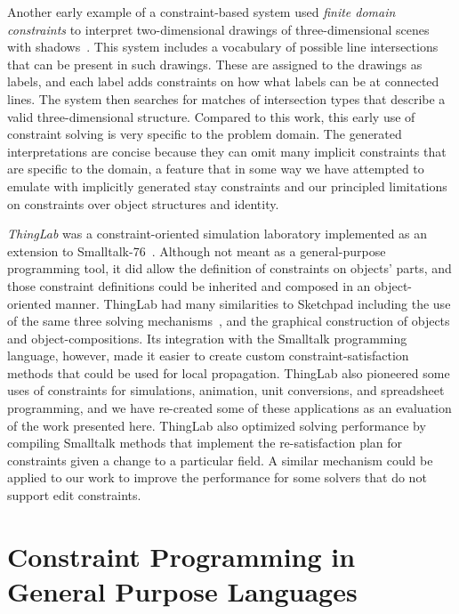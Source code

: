 Another early example of a constraint-based system used \emph{finite domain
  constraints} to interpret two-dimensional drawings of three-dimensional scenes
with shadows~\cite{waltz1972generating}. %
This system includes a vocabulary of possible
line intersections that can be present in such drawings. These are assigned to
the drawings as labels, and each label adds constraints on how what labels can
be at connected lines. %
The system then searches for matches of intersection
types that describe a valid three-dimensional structure. Compared to this work,
this early use of constraint solving is very specific to the problem domain. The
generated interpretations %
are concise because they can omit
many implicit constraints that are specific to the domain, a feature that in
some way we have attempted to emulate with implicitly generated stay constraints
and our principled limitations on constraints over object structures and
identity.

\emph{ThingLab} was a constraint-oriented simulation laboratory implemented
as an extension to
Smalltalk-76~\cite{ingalls1978smalltalk}. Although not meant as a
general-purpose programming tool, it did allow the definition of constraints on
objects' parts, and those constraint definitions could be inherited and composed
in an object-oriented manner. ThingLab had many similarities to Sketchpad
including the use of the same three solving
mechanisms~\cite{borning2012architectures}, and the graphical construction of
objects and object-compositions. Its integration with the Smalltalk programming
language, however, made it easier to create custom constraint-satisfaction
methods that could be used for local propagation. ThingLab also pioneered some
uses of constraints for simulations, animation, unit conversions, and
spreadsheet programming, and we have re-created some of these applications as an
evaluation of the work presented here. ThingLab also optimized solving
performance by compiling Smalltalk methods that implement the re-satisfaction
plan for constraints given a change to a particular field. A similar mechanism
could be applied to our work to improve the performance for some solvers that do
not support edit constraints.

\section{Constraint Programming in General Purpose Languages}
\label{sec:logic-constr-progr}

